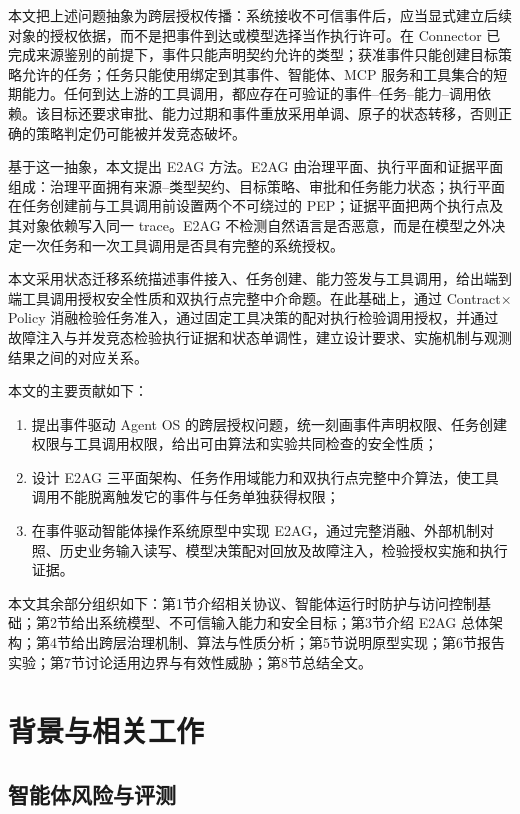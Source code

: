 本文把上述问题抽象为跨层授权传播：系统接收不可信事件后，应当显式建立后续对象的授权依据，而不是把事件到达或模型选择当作执行许可。在 Connector 已完成来源鉴别的前提下，事件只能声明契约允许的类型；获准事件只能创建目标策略允许的任务；任务只能使用绑定到其事件、智能体、MCP 服务和工具集合的短期能力。任何到达上游的工具调用，都应存在可验证的事件--任务--能力--调用依赖。该目标还要求审批、能力过期和事件重放采用单调、原子的状态转移，否则正确的策略判定仍可能被并发竞态破坏。

基于这一抽象，本文提出 E2AG 方法。E2AG 由治理平面、执行平面和证据平面组成：治理平面拥有来源--类型契约、目标策略、审批和任务能力状态；执行平面在任务创建前与工具调用前设置两个不可绕过的 PEP；证据平面把两个执行点及其对象依赖写入同一 trace。E2AG 不检测自然语言是否恶意，而是在模型之外决定一次任务和一次工具调用是否具有完整的系统授权。

本文采用状态迁移系统描述事件接入、任务创建、能力签发与工具调用，给出端到端工具调用授权安全性质和双执行点完整中介命题。在此基础上，通过 Contract$\times$Policy 消融检验任务准入，通过固定工具决策的配对执行检验调用授权，并通过故障注入与并发竞态检验执行证据和状态单调性，建立设计要求、实施机制与观测结果之间的对应关系。

本文的主要贡献如下：
\begin{enumerate}
  \item 提出事件驱动 Agent OS 的跨层授权问题，统一刻画事件声明权限、任务创建权限与工具调用权限，给出可由算法和实验共同检查的安全性质；
  \item 设计 E2AG 三平面架构、任务作用域能力和双执行点完整中介算法，使工具调用不能脱离触发它的事件与任务单独获得权限；
  \item 在事件驱动智能体操作系统原型中实现 E2AG，通过完整消融、外部机制对照、历史业务输入读写、模型决策配对回放及故障注入，检验授权实施和执行证据。
\end{enumerate}

本文其余部分组织如下：第1节介绍相关协议、智能体运行时防护与访问控制基础；第2节给出系统模型、不可信输入能力和安全目标；第3节介绍 E2AG 总体架构；第4节给出跨层治理机制、算法与性质分析；第5节说明原型实现；第6节报告实验；第7节讨论适用边界与有效性威胁；第8节总结全文。

\section{背景与相关工作}\label{sec:related-v11}

\subsection{智能体风险与评测}

